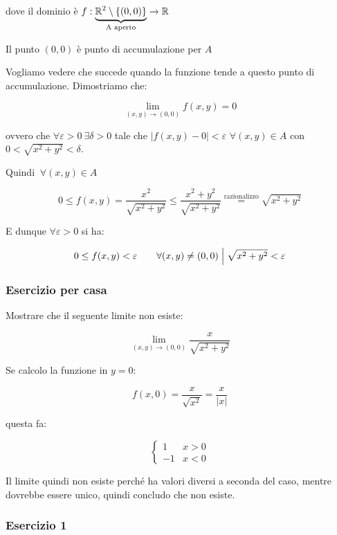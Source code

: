 dove il dominio è \(f: \underbrace{\R^{2}\setminus \{(0,0)\}}_\text{A aperto}\rightarrow \R \)

Il punto \((0,0)\) è punto di accumulazione per \(A\)

Vogliamo vedere che succede quando la funzione tende a questo punto di accumulazione. Dimostriamo che:

\[
    \lim_{ (x,y) \to (0,0) } f(x,y) = 0
\]

ovvero che \(\forall \varepsilon >0 ~\exists \delta >0\) tale che \(|f(x,y) -0| < \varepsilon \) \(\forall (x,y) \in A\) con \(0< \sqrt{x^{2}+y^{2}}<\delta \).

Quindi \(~\forall (x,y) \in A\)

\[
    0 \le f(x,y) = \frac{x^{2}}{\sqrt{x^{2}+y^{2}}} \le \frac{x^{2}+y^{2}}{\sqrt{x^{2}+y^{2}}} \overset{\text{razionalizzo}}{=} \sqrt{x^{2}+y^{2}}
\]

E dunque  \(\forall \varepsilon > 0\) si ha:

\[
    0 \le f(x,y) < \varepsilon \qquad \forall (x,y) \neq (0,0) \giventhat[\Big] \sqrt{x^{2}+y^{2}} < \varepsilon
\]

\filbreak{}
\subsubsection*{Esercizio per casa}

Mostrare che il seguente limite non esiste:

\[
    \lim_{ (x,y) \to (0,0) } \frac{x}{\sqrt{x^{2}+y^{2}}}
\]

Se calcolo la funzione in \(y=0\):

\[
    f(x,0) = \frac{x}{\sqrt{x^{2}}}= \frac{x}{|x|}
\]

questa fa:

\begin{equation*}
    \begin{cases}
        1  & x > 0 \\
        -1 & x < 0
    \end{cases}
\end{equation*}

Il limite quindi non esiste perché ha valori diversi a seconda del caso, mentre dovrebbe essere unico, quindi concludo che non esiste.

\filbreak{}
\subsubsection*{Esercizio 1}

